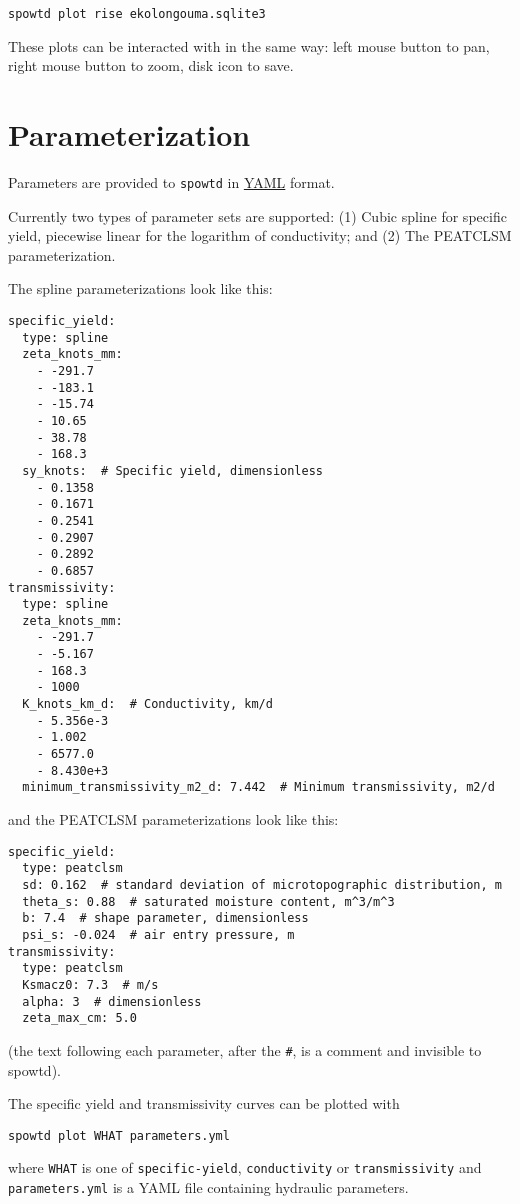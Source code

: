 \documentclass[11pt,a4paper]{article}
\begin{document}
\begin{lstlisting}[frame=single]
spowtd plot rise ekolongouma.sqlite3
\end{lstlisting}
These plots can be interacted with in the same way: left mouse button
to pan, right mouse button to zoom, disk icon to save.

\section{Parameterization}
Parameters are provided to \texttt{spowtd} in
\href{https://yaml.org/}{YAML} format.

Currently two types of parameter sets are supported: (1) Cubic spline
for specific yield, piecewise linear for the logarithm of
conductivity; and (2) The PEATCLSM parameterization.

The spline parameterizations look like this:
\begin{lstlisting}[frame=single]
specific_yield:
  type: spline
  zeta_knots_mm:
    - -291.7
    - -183.1
    - -15.74
    - 10.65
    - 38.78
    - 168.3
  sy_knots:  # Specific yield, dimensionless
    - 0.1358
    - 0.1671
    - 0.2541
    - 0.2907
    - 0.2892
    - 0.6857
transmissivity:
  type: spline
  zeta_knots_mm:
    - -291.7
    - -5.167
    - 168.3
    - 1000
  K_knots_km_d:  # Conductivity, km/d
    - 5.356e-3
    - 1.002
    - 6577.0
    - 8.430e+3
  minimum_transmissivity_m2_d: 7.442  # Minimum transmissivity, m2/d
\end{lstlisting}
and the PEATCLSM parameterizations look like this:
\begin{lstlisting}[frame=single]
specific_yield:
  type: peatclsm
  sd: 0.162  # standard deviation of microtopographic distribution, m
  theta_s: 0.88  # saturated moisture content, m^3/m^3
  b: 7.4  # shape parameter, dimensionless
  psi_s: -0.024  # air entry pressure, m
transmissivity:
  type: peatclsm
  Ksmacz0: 7.3  # m/s
  alpha: 3  # dimensionless
  zeta_max_cm: 5.0
\end{lstlisting}
(the text following each parameter, after the \verb|#|, is a comment
and invisible to spowtd).

The specific yield and transmissivity curves can be plotted with
\begin{lstlisting}[frame=single]
  spowtd plot WHAT parameters.yml
\end{lstlisting}
where \texttt{WHAT} is one of \texttt{specific-yield},
\texttt{conductivity} or \texttt{transmissivity} and
\texttt{parameters.yml} is a YAML file containing hydraulic
parameters.
\end{document}
